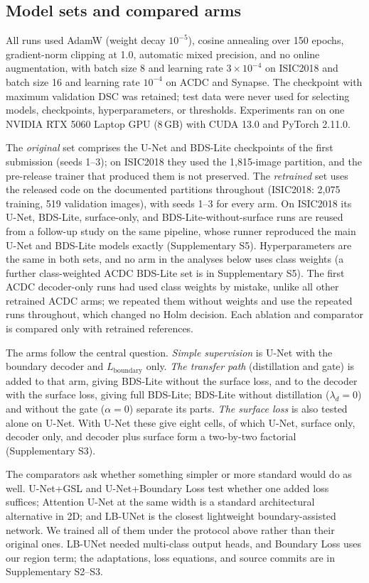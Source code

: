 \documentclass[fleqn,10pt,lineno]{wlpeerj}
\begin{document}
\subsection*{Model sets and compared arms}
All runs used AdamW (weight decay $10^{-5}$), cosine annealing over 150 epochs, gradient-norm clipping at 1.0, automatic mixed precision, and no online augmentation, with batch size 8 and learning rate $3\times10^{-4}$ on ISIC2018 and batch size 16 and learning rate $10^{-4}$ on ACDC and Synapse. The checkpoint with maximum validation DSC was retained; test data were never used for selecting models, checkpoints, hyperparameters, or thresholds. Experiments ran on one NVIDIA RTX 5060 Laptop GPU (8\,GB) with CUDA 13.0 and PyTorch 2.11.0.

The \emph{original} set comprises the U-Net and BDS-Lite checkpoints of the first submission (seeds 1--3); on ISIC2018 they used the 1,815-image partition, and the pre-release trainer that produced them is not preserved. The \emph{retrained} set uses the released code on the documented partitions throughout (ISIC2018: 2,075 training, 519 validation images), with seeds 1--3 for every arm. On ISIC2018 its U-Net, BDS-Lite, surface-only, and BDS-Lite-without-surface runs are reused from a follow-up study on the same pipeline, whose runner reproduced the main U-Net and BDS-Lite models exactly (Supplementary S5). Hyperparameters are the same in both sets, and no arm in the analyses below uses class weights (a further class-weighted ACDC BDS-Lite set is in Supplementary S5). The first ACDC decoder-only runs had used class weights by mistake, unlike all other retrained ACDC arms; we repeated them without weights and use the repeated runs throughout, which changed no Holm decision. Each ablation and comparator is compared only with retrained references.

The arms follow the central question. \emph{Simple supervision} is U-Net with the boundary decoder and $L_{\mathrm{boundary}}$ only. \emph{The transfer path} (distillation and gate) is added to that arm, giving BDS-Lite without the surface loss, and to the decoder with the surface loss, giving full BDS-Lite; BDS-Lite without distillation ($\lambda_d=0$) and without the gate ($\alpha=0$) separate its parts. \emph{The surface loss} is also tested alone on U-Net. With U-Net these give eight cells, of which U-Net, surface only, decoder only, and decoder plus surface form a two-by-two factorial (Supplementary S3).

The comparators ask whether something simpler or more standard would do as well. U-Net+GSL \citep{Celaya2024A} and U-Net+Boundary Loss \citep{Kervadec2019Boundary} test whether one added loss suffices; Attention U-Net \citep{Oktay2018Attention} at the same width is a standard architectural alternative in 2D; and LB-UNet \citep{Xu2024LBUNet} is the closest lightweight boundary-assisted network. We trained all of them under the protocol above rather than their original ones. LB-UNet needed multi-class output heads, and Boundary Loss uses our region term; the adaptations, loss equations, and source commits are in Supplementary S2--S3.
\end{document}
